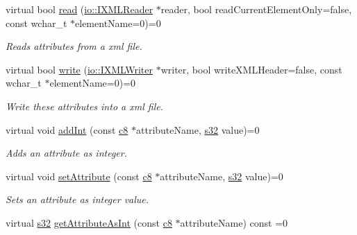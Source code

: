 \begin{DoxyCompactItemize}
virtual bool \hyperlink{classirr_1_1io_1_1IAttributes_a9001fd2760cba4e1b13efc6539c0f441}{read} (\hyperlink{namespaceirr_1_1io_a9dc6291fb7e4c73155a3e3c8339f9bff}{io\+::\+I\+X\+M\+L\+Reader} $\ast$reader, bool read\+Current\+Element\+Only=false, const wchar\+\_\+t $\ast$element\+Name=0)=0
\begin{DoxyCompactList}\small\item\em Reads attributes from a xml file. \end{DoxyCompactList}\item 
virtual bool \hyperlink{classirr_1_1io_1_1IAttributes_a5a32fcdfca5426cccf69e8f654a0050c}{write} (\hyperlink{classirr_1_1io_1_1IXMLWriter}{io\+::\+I\+X\+M\+L\+Writer} $\ast$writer, bool write\+X\+M\+L\+Header=false, const wchar\+\_\+t $\ast$element\+Name=0)=0
\begin{DoxyCompactList}\small\item\em Write these attributes into a xml file. \end{DoxyCompactList}\item 
\mbox{\label{classirr_1_1io_1_1IAttributes_afbde111f36d59e9cf42b20595cf2ed24}} 
virtual void \hyperlink{classirr_1_1io_1_1IAttributes_afbde111f36d59e9cf42b20595cf2ed24}{add\+Int} (const \hyperlink{namespaceirr_a9395eaea339bcb546b319e9c96bf7410}{c8} $\ast$attribute\+Name, \hyperlink{namespaceirr_ac66849b7a6ed16e30ebede579f9b47c6}{s32} value)=0
\begin{DoxyCompactList}\small\item\em Adds an attribute as integer. \end{DoxyCompactList}\item 
\mbox{\label{classirr_1_1io_1_1IAttributes_a03fa31acb481ae23678676cc183f09a6}} 
virtual void \hyperlink{classirr_1_1io_1_1IAttributes_a03fa31acb481ae23678676cc183f09a6}{set\+Attribute} (const \hyperlink{namespaceirr_a9395eaea339bcb546b319e9c96bf7410}{c8} $\ast$attribute\+Name, \hyperlink{namespaceirr_ac66849b7a6ed16e30ebede579f9b47c6}{s32} value)=0
\begin{DoxyCompactList}\small\item\em Sets an attribute as integer value. \end{DoxyCompactList}\item 
virtual \hyperlink{namespaceirr_ac66849b7a6ed16e30ebede579f9b47c6}{s32} \hyperlink{classirr_1_1io_1_1IAttributes_ac6c51254c9d43cb58cb89866cdd210ed}{get\+Attribute\+As\+Int} (const \hyperlink{namespaceirr_a9395eaea339bcb546b319e9c96bf7410}{c8} $\ast$attribute\+Name) const =0

\end{DoxyCompactItemize}
